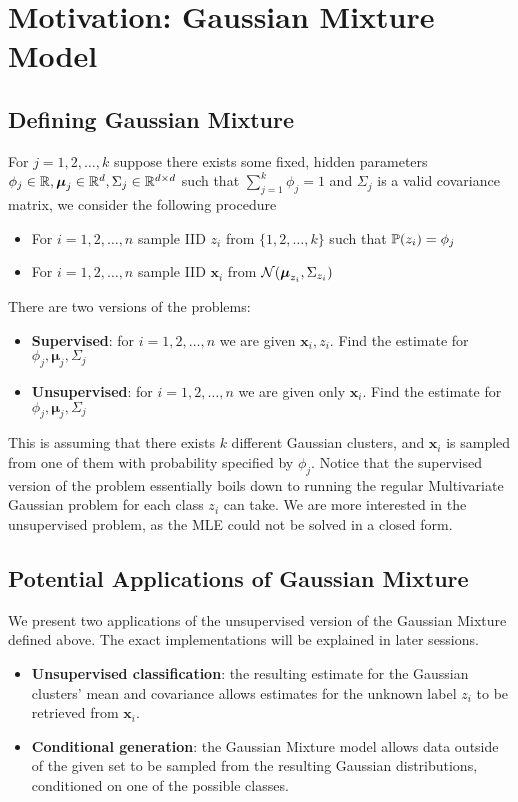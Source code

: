 \section{Motivation: Gaussian Mixture Model}
\subsection{Defining Gaussian Mixture}
\begin{definition}
    For $j=1,2,\dots,k$ suppose there exists some fixed, hidden parameters $\phi_j \in \mathbb{R},\boldsymbol{\mu}_j \in \mathbb{R}^d,\Sigma_j \in \mathbb{R}^{d\times d}$ such that $\sum_{j=1}^k \phi_j = 1$ and $\Sigma_j$ is a valid covariance matrix, we consider the following procedure
    \begin{itemize}
        \item For $i=1,2,\dots,n$ sample IID $z_i$ from $\{1,2,\dots,k\}$ such that $\mathbb{P}(z_i)=\phi_j$
        \item For $i=1,2,\dots,n$ sample IID $\textbf{x}_i$ from $\mathcal{N}(\boldsymbol{\mu}_{z_i},\Sigma_{z_i})$
    \end{itemize}
    There are two versions of the problems:
    \begin{itemize}
        \item \textbf{Supervised}: for $i=1,2,\dots,n$ we are given $\textbf{x}_i,z_i$. Find the estimate for $\phi_j,\boldsymbol{\mu}_j,\Sigma_j$
        \item \textbf{Unsupervised}: for $i=1,2,\dots,n$ we are given only $\textbf{x}_i$. Find the estimate for $\phi_j,\boldsymbol{\mu}_j,\Sigma_j$
    \end{itemize}
\end{definition}
This is assuming that there exists $k$ different Gaussian clusters, and $\mathbf{x}_i$ is sampled from one of them with probability specified by $\phi_j$. Notice that the supervised version of the problem essentially boils down to running the regular Multivariate Gaussian problem for each class $z_i$ can take. We are more interested in the unsupervised problem, as the MLE could not be solved in a closed form.
\subsection{Potential Applications of Gaussian Mixture}
We present two applications of the unsupervised version of the Gaussian Mixture defined above. The exact implementations will be explained in later sessions.
\begin{itemize}
    \item \textbf{Unsupervised classification}: the resulting estimate for the Gaussian clusters' mean and covariance allows estimates for the unknown label $z_i$ to be retrieved from $\textbf{x}_i$.
    \item \textbf{Conditional generation}: the Gaussian Mixture model allows data outside of the given set to be sampled from the resulting Gaussian distributions, conditioned on one of the possible classes.
\end{itemize}
